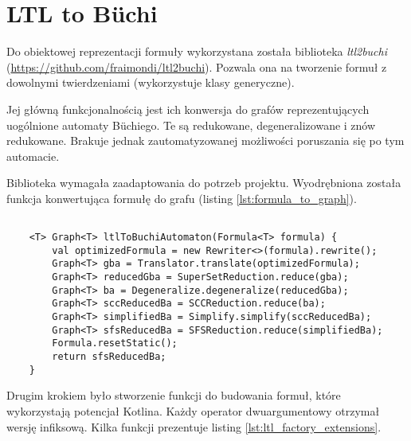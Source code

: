 \section{LTL to Büchi} \label{sec:ltl2buchi}

Do obiektowej reprezentacji formuły wykorzystana została biblioteka \textit{ltl2buchi} \\(\url{https://github.com/fraimondi/ltl2buchi}).
Pozwala ona na tworzenie formuł z dowolnymi twierdzeniami (wykorzystuje klasy generyczne).

Jej główną funkcjonalnością jest ich konwersja do grafów reprezentujących uogólnione automaty Büchiego.
Te są redukowane, degeneralizowane i znów redukowane.
Brakuje jednak zautomatyzowanej możliwości poruszania się po tym automacie.

Biblioteka wymagała zaadaptowania do potrzeb projektu.
Wyodrębniona została funkcja konwertująca formułę do grafu (listing \ref{lst:formula_to_graph}).

\begin{minipage}{\linewidth}
\begin{lstlisting}[caption={Funkcja konwertująca formułę LTL do grafu.},captionpos=b,label={lst:formula_to_graph}]

    <T> Graph<T> ltlToBuchiAutomaton(Formula<T> formula) {
        val optimizedFormula = new Rewriter<>(formula).rewrite();
        Graph<T> gba = Translator.translate(optimizedFormula);
        Graph<T> reducedGba = SuperSetReduction.reduce(gba);
        Graph<T> ba = Degeneralize.degeneralize(reducedGba);
        Graph<T> sccReducedBa = SCCReduction.reduce(ba);
        Graph<T> simplifiedBa = Simplify.simplify(sccReducedBa);
        Graph<T> sfsReducedBa = SFSReduction.reduce(simplifiedBa);
        Formula.resetStatic();
        return sfsReducedBa;
    }

\end{lstlisting}
\end{minipage}

Drugim krokiem było stworzenie funkcji do budowania formuł, które wykorzystają potencjał Kotlina.
Każdy operator dwuargumentowy otrzymał wersję infiksową.
Kilka funkcji prezentuje listing \ref{lst:ltl_factory_extensions}.


